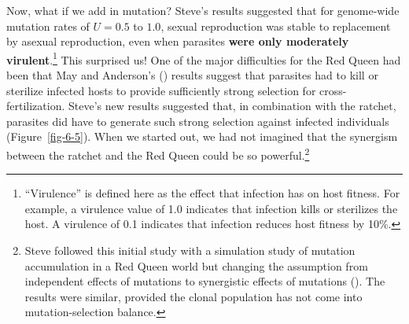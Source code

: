 \documentclass[
  letterpaper,
]{book}
\begin{document}
Now, what if we add in mutation? Steve's results suggested that for
genome-wide mutation rates of \(U = 0.5\) to \(1.0\), sexual
reproduction was stable to replacement by asexual reproduction, even
when parasites \textbf{were only moderately virulent}.\footnote{``Virulence''
  is defined here as the effect that infection has on host fitness. For
  example, a virulence value of 1.0 indicates that infection kills or
  sterilizes the host. A virulence of 0.1 indicates that infection
  reduces host fitness by 10\%.} This surprised us! One of the major
difficulties for the Red Queen had been that May and Anderson's
() results suggest that parasites had to
kill or sterilize infected hosts to provide sufficiently strong
selection for cross-fertilization. Steve's new results suggested that,
in combination with the ratchet, parasites did have to generate such
strong selection against infected individuals (Figure~\ref{fig-6-5}).
When we started out, we had not imagined that the synergism between the
ratchet and the Red Queen could be so powerful.\footnote{Steve followed
  this initial study with a simulation study of mutation accumulation in
  a Red Queen world but changing the assumption from independent effects
  of mutations to synergistic effects of mutations
  (). The results were
  similar, provided the clonal population has not come into
  mutation-selection balance.}
\end{document}
